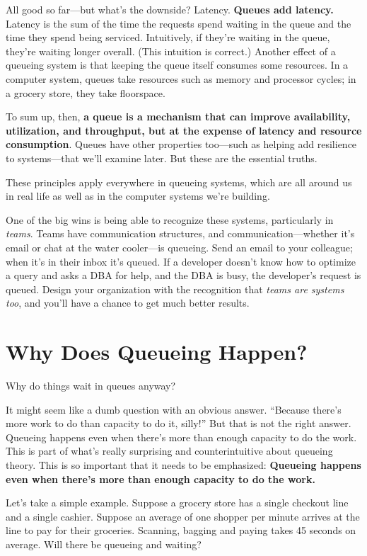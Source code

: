 \documentclass{vivid_layout}
\begin{document}
All good so far---but what's the downside? Latency. {\bfseries Queues add
latency.} Latency is the sum of the time the requests spend waiting in the queue
and the time they spend being serviced. Intuitively, if they're waiting in the
queue, they're waiting longer overall. (This intuition is correct.) Another
effect of a queueing system is that keeping the queue itself consumes some
resources. In a computer system, queues take resources such as memory and
processor cycles; in a grocery store, they take floorspace.

To sum up, then, {\bfseries a queue is a mechanism that can improve
availability, utilization, and throughput, but at the expense of latency and
resource consumption}. Queues have other properties too---such as helping add
resilience to systems---that we'll examine later. But these are the essential
truths.

These principles apply everywhere in queueing systems, which are all around
us in real life as well as in the computer systems we're building.

One of the big wins is being able to recognize these systems, particularly in {\itshape teams}. Teams have communication structures, and communication---whether it's email or chat at the water cooler---is queueing. Send an email to your colleague; when it's in their inbox it's queued. If a developer doesn't know how to optimize a query and asks a DBA for help, and the DBA is busy, the developer's request is queued. Design your organization with the recognition that {\itshape teams are systems too}, and you'll have a chance to get much better results.

\section{Why Does Queueing Happen?}

Why do things wait in queues anyway?

It might seem like a dumb question with an obvious answer. ``Because there's more work to do than capacity to do it, silly!'' But that is not the right answer. Queueing happens even when there's more than enough capacity to do the work. This is part of what's really surprising and counterintuitive about queueing theory. This is so important that it needs to be emphasized:
{\bfseries Queueing happens even when there's more than enough capacity to do the work.}

Let's take a simple example. Suppose a grocery store has a single checkout line and a single cashier. Suppose an average of one shopper per minute arrives at the line to pay for their groceries. Scanning, bagging and paying takes 45 seconds on average. Will there be queueing and waiting?
\end{document}
